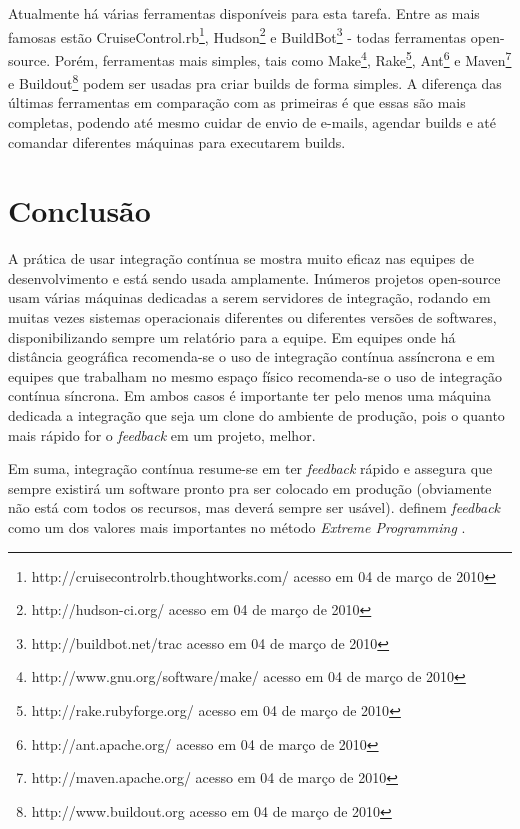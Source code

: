 \documentclass[10pt,a4paper,font=plain]{abnt}
\begin{document}
Atualmente há várias ferramentas disponíveis para esta tarefa. Entre as mais famosas estão CruiseControl.rb\footnote{http://cruisecontrolrb.thoughtworks.com/ acesso em 04 de março de 2010}, Hudson\footnote{http://hudson-ci.org/ acesso em 04 de março de 2010} e BuildBot\footnote{http://buildbot.net/trac acesso em 04 de março de 2010} - todas ferramentas open-source. Porém, ferramentas mais simples, tais como Make\footnote{http://www.gnu.org/software/make/ acesso em 04 de março de 2010}, Rake\footnote{ http://rake.rubyforge.org/ acesso em 04 de março de 2010}, Ant\footnote{http://ant.apache.org/ acesso em 04 de março de 2010} e Maven\footnote{http://maven.apache.org/ acesso em 04 de março de 2010} e Buildout\footnote{http://www.buildout.org acesso em 04 de março de 2010} podem ser usadas pra criar builds de forma simples. A diferença das últimas ferramentas em comparação com as primeiras é que essas são mais completas, podendo até mesmo cuidar de envio de e-mails, agendar builds e até comandar diferentes máquinas para executarem builds.

\section{Conclusão}

A prática de usar integração contínua se mostra muito eficaz nas equipes de desenvolvimento e está sendo usada amplamente. Inúmeros projetos open-source usam várias máquinas dedicadas a serem servidores de integração, rodando em muitas vezes sistemas operacionais diferentes ou diferentes versões de softwares, disponibilizando sempre um relatório para a equipe. Em equipes onde há distância geográfica recomenda-se o uso de integração contínua assíncrona e em equipes que trabalham no mesmo espaço físico recomenda-se o uso de integração contínua síncrona. Em ambos casos é importante ter pelo menos uma máquina dedicada a integração que seja um clone do ambiente de produção, pois o quanto mais rápido for o \textit{feedback} em um projeto, melhor.

Em suma, integração contínua resume-se em ter \textit{feedback} rápido e assegura que sempre existirá um software pronto pra ser colocado em produção (obviamente não está com todos os recursos, mas deverá sempre ser usável).  definem \textit{feedback} como um dos valores mais importantes no método \textit{Extreme Programming} \cite{XP}.


\end{document}
